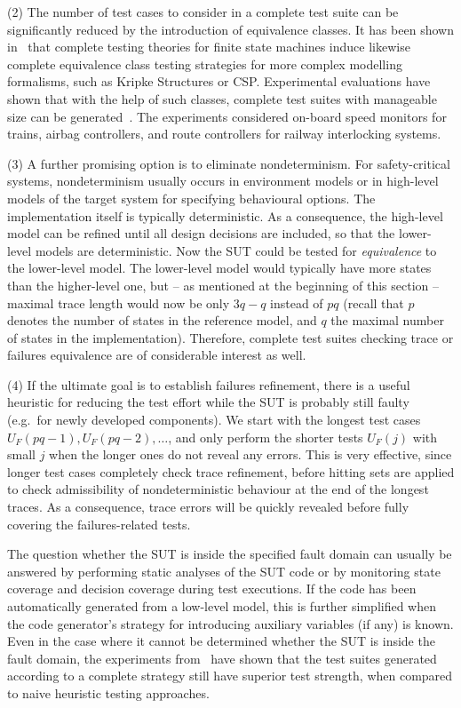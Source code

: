 \documentclass[3p,times]{elsarticle}
\begin{document}
\medskip
\noindent
(2) The number of test cases to consider in a complete test suite can be significantly reduced by the introduction of equivalence classes. It has been shown in~\cite{Huang2017} that complete testing theories for finite state machines induce likewise complete
equivalence class testing 
strategies for more complex modelling formalisms, such as Kripke Structures or CSP. Experimental evaluations have shown that with the help of such classes, complete test suites with manageable size can be generated~\cite{DBLP:conf/rssrail/PeleskaHH16,Huebner2017}. The experiments considered on-board speed monitors for trains, airbag controllers, and route controllers for railway interlocking systems.

\medskip
\noindent
(3) A further promising option is to eliminate nondeterminism. For safety-critical systems, nondeterminism usually occurs in environment models or in high-level models of the target system for
specifying behavioural options. The implementation itself is typically deterministic. As a consequence, the high-level model can be refined until all design decisions are included, so that the 
lower-level models are deterministic. Now the SUT could be tested for \emph{equivalence} to the lower-level model. The lower-level model would typically have more states than the higher-level one, but 
-- as mentioned at the beginning of this section -- maximal trace length would now be only $3q-q$ instead of $pq$
(recall that $p$ denotes the number of states in the reference model, and $q$ the maximal number of states in the implementation). Therefore, complete test suites checking trace or failures equivalence are of considerable interest as well.


\medskip
\noindent
(4) If the ultimate goal is to establish failures refinement, there is a useful  heuristic for reducing the test effort while the SUT is probably still faulty (e.g.~for newly developed components). We start with the longest test cases $U_F(pq-1), U_F(pq-2), \dots$, and only perform
the shorter tests $U_F(j)$ with small $j$ when the longer ones do not reveal any errors. This is
very effective, since longer test cases completely check trace refinement, before hitting sets are
applied to check admissibility of nondeterministic behaviour at the end of the longest traces. 
As a consequence, trace errors will be quickly revealed before fully covering the failures-related tests. 
 


The question whether the SUT is inside the specified fault domain can usually be answered 
by performing static analyses of the SUT code or by monitoring state coverage and decision coverage during test executions. If the code has been automatically generated
from a low-level model, this is further simplified when the code generator's strategy for introducing auxiliary variables (if any) is known. Even in the case where it cannot be determined whether the SUT is inside the fault domain, the experiments from~\cite{DBLP:conf/rssrail/PeleskaHH16,Huebner2017} have shown that the test suites generated according to a complete strategy still have superior test strength, when compared to naive heuristic testing approaches.
\end{document}
